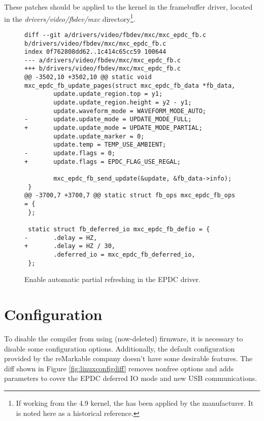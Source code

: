 \documentclass{memoir}
\begin{document}
These patches should be applied to the kernel in the framebuffer driver, located in the \textit{drivers/video/fbdev/mxc} directory\footnote{If working from the 4.9 kernel, the  has been applied by the manufacturer. It is noted here as a historical reference.}.

\pagebreak
\begin{figure}[h]
\begin{verbatim}
diff --git a/drivers/video/fbdev/mxc/mxc_epdc_fb.c b/drivers/video/fbdev/mxc/mxc_epdc_fb.c
index 0f762808dd62..1c414c65cc59 100644
--- a/drivers/video/fbdev/mxc/mxc_epdc_fb.c
+++ b/drivers/video/fbdev/mxc/mxc_epdc_fb.c
@@ -3502,10 +3502,10 @@ static void mxc_epdc_fb_update_pages(struct mxc_epdc_fb_data *fb_data,
        update.update_region.top = y1;
        update.update_region.height = y2 - y1;
        update.waveform_mode = WAVEFORM_MODE_AUTO;
-       update.update_mode = UPDATE_MODE_FULL;
+       update.update_mode = UPDATE_MODE_PARTIAL;
        update.update_marker = 0;
        update.temp = TEMP_USE_AMBIENT;
-       update.flags = 0;
+       update.flags = EPDC_FLAG_USE_REGAL;
 
        mxc_epdc_fb_send_update(&update, &fb_data->info);
 }
@@ -3700,7 +3700,7 @@ static struct fb_ops mxc_epdc_fb_ops = {
 };
 
 static struct fb_deferred_io mxc_epdc_fb_defio = {
-       .delay = HZ,
+       .delay = HZ / 30,
        .deferred_io = mxc_epdc_fb_deferred_io,
 };
\end{verbatim}
\caption{Enable automatic partial refreshing in the EPDC driver.}
\label{fig:epdcautopart}
\end{figure}



\section{Configuration}
To disable the compiler from using (now-deleted) firmware, it is necessary to disable some configuration options. Additionally, the default configuration provided by the reMarkable company doesn't have some desirable features. The diff shown in Figure \ref{fig:linuxconfigdiff} removes nonfree options and adds parameters to cover the EPDC deferred IO mode and new USB communications.
\end{document}
